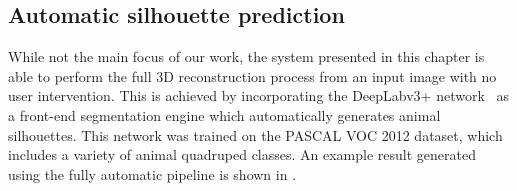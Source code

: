 

\subsection{Automatic silhouette prediction}
While not the main focus of our work, the system presented in this chapter is able to perform the full 3D reconstruction process from an input image with no user intervention. This is achieved by incorporating the DeepLabv3+ network~\cite{deeplabv3plus} as a front-end segmentation engine which automatically generates animal silhouettes. This network was trained on the PASCAL VOC 2012 dataset, which includes a variety of animal quadruped classes. An example result generated using the fully automatic pipeline is shown in .


